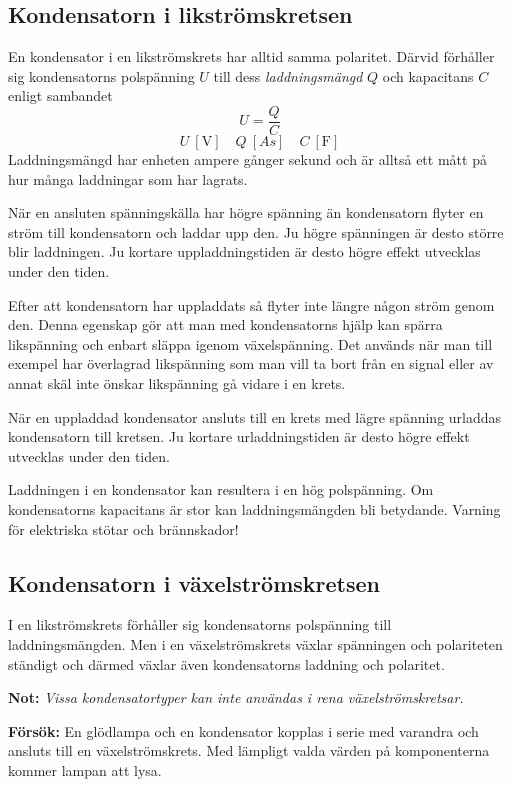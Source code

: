 \subsection{Kondensatorn i likströmskretsen}

En kondensator i en likströmskrets har alltid samma polaritet.
Därvid förhåller sig kondensatorns polspänning \(U\) till dess
\emph{laddningsmängd} \(Q\) och kapacitans \(C\) enligt sambandet
\[U = \frac{Q}{C} \]
\[U\ [\unit{\volt}]\quad Q\ [As]\quad C\ [\unit{\farad}]\]
Laddningsmängd har enheten ampere gånger sekund och är alltså ett mått på hur
många laddningar som har lagrats.

När en ansluten spänningskälla har högre spänning än kondensatorn flyter en
ström till kondensatorn och laddar upp den.
Ju högre spänningen är desto större blir laddningen.
Ju kortare uppladdningstiden är desto högre effekt utvecklas under den tiden.

Efter att kondensatorn har uppladdats så flyter inte längre någon ström genom
den.
Denna egenskap gör att man med kondensatorns hjälp kan spärra likspänning och
enbart släppa igenom växelspänning.
Det används när man till exempel har överlagrad likspänning som man vill ta bort
från en signal eller av annat skäl inte önskar likspänning gå vidare i en krets.

När en uppladdad kondensator ansluts till en krets med lägre spänning urladdas
kondensatorn till kretsen.
Ju kortare urladdningstiden är desto högre effekt utvecklas under den tiden.

Laddningen i en kondensator kan resultera i en hög polspänning.
Om kondensatorns kapacitans är stor kan laddningsmängden bli betydande.
Varning för elektriska stötar och brännskador!

\subsection{Kondensatorn i växelströmskretsen}

I en likströmskrets förhåller sig kondensatorns polspänning till
laddningsmängden.
Men i en växelströmskrets växlar spänningen och polariteten ständigt och därmed
växlar även kondensatorns laddning och polaritet.

\textbf{Not:} \emph{Vissa kondensatortyper kan inte användas i rena
  växelströmskretsar.}

\textbf{Försök:} En glödlampa och en kondensator kopplas i serie
med varandra och ansluts till en växelströmskrets. Med lämpligt
valda värden på komponenterna kommer lampan att lysa.

